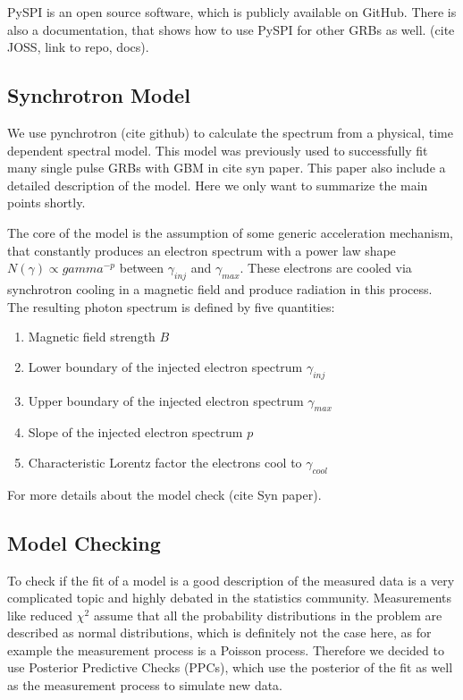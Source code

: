 \documentclass[modern]{aastex631}
\begin{document}
PySPI is an open source software, which is publicly available on GitHub. There is also a documentation, that shows how to use PySPI for other GRBs as well. (cite JOSS, link to repo, docs).

\subsection{Synchrotron Model}

We use pynchrotron (cite github) to calculate the spectrum from a physical, time dependent spectral model. This model was previously used to successfully fit many single pulse GRBs with GBM in cite syn paper. This paper also include a detailed description of the model. Here we only want to summarize the main points shortly.

The core of the model is the assumption of some generic acceleration mechanism, that constantly produces an electron spectrum with a power law shape $N(\gamma )\propto gamma^{-p}$ between $\gamma_{inj}$ and $\gamma_{max}$. These electrons are cooled via synchrotron cooling in a magnetic field and produce radiation in this process. The resulting photon spectrum is defined by five quantities:

\begin{enumerate}
	\item Magnetic field strength $B$
  \item Lower boundary of the injected electron spectrum $\gamma_{inj}$
  \item Upper boundary of the injected electron spectrum $\gamma_{max}$
  \item Slope of the injected electron spectrum $p$
  \item Characteristic Lorentz factor the electrons cool to $\gamma_{cool}$
\end{enumerate}

For more details about the model check (cite Syn paper).

\subsection{Model Checking}

To check if the fit of a model is a good description of the measured data is a very complicated topic and highly debated in the statistics community. Measurements like reduced $\chi^{2}$ assume that all the probability distributions in the problem are described as normal distributions, which is definitely not the case here, as for example the measurement process is a Poisson process. Therefore we decided to use Posterior Predictive Checks (PPCs), which use the posterior of the fit as well as the measurement process to simulate new data.
\end{document}
